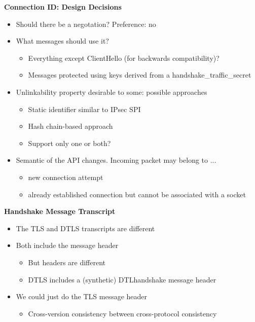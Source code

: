 \documentclass[helvetica]{seminar}
\newcommand{\heading}[1]{%
  \begin{center} 
    \large\bf 
    #1 
  \end{center} 
  \vspace{.4 in}}
\begin{document}
\begin{slide}
\heading{Connection ID: Design Decisions}
\begin{itemize} 

\item Should there be a negotation? Preference: no

\item What messages should use it?  

  \begin{itemize} 
  \item Everything except ClientHello (for backwards compatibility)?
  \item Messages protected using keys derived from a handshake\_traffic\_secret 
  \end{itemize} 

\item Unlinkability property desirable to some: possible approaches

  \begin{itemize} 
  \item Static identifier similar to IPsec SPI
  \item Hash chain-based approach
  \item Support only one or both?  
  \end{itemize} 

\item Semantic of the API changes. Incoming packet may belong to ... 
  \begin{itemize} 
  \item new connection attempt
  \item already established connection but cannot be associated with a socket
  \end{itemize} 
  
\end{itemize} 
\end{slide}


\begin{slide}
\heading{Handshake Message Transcript}

\begin{itemize}
\item The TLS and DTLS transcripts are different
\item Both include the message header
  \begin{itemize}
  \item But headers are different
  \item DTLS includes a (synthetic) DTLhandshake message header
  \end{itemize}
\item We could just do the TLS message header
  \begin{itemize}
  \item Cross-version consistency between cross-protocol consistency
  \end{itemize}
\end{itemize}


\end{slide}
\end{document}
